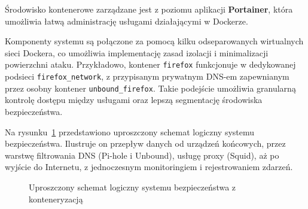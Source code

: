 \documentclass[
    left=2.5cm,         %
    right=2.5cm,        %
    top=2.5cm,          %
    bottom=3cm,         %
    bindingoffset=6mm,  %
    nohyphenation=true %
]{eiti/eiti-thesis} %
\begin{document}
Środowisko kontenerowe zarządzane jest z poziomu aplikacji \textbf{Portainer}, która umożliwia łatwą administrację usługami działającymi w Dockerze.

Komponenty systemu są połączone za pomocą kilku odseparowanych wirtualnych sieci Dockera, co umożliwia implementację zasad izolacji i minimalizacji powierzchni ataku. Przykładowo, kontener \texttt{firefox} funkcjonuje w dedykowanej podsieci \texttt{firefox\_network}, z przypisanym prywatnym DNS-em zapewnianym przez osobny kontener \texttt{unbound\_firefox}. Takie podejście umożliwia granularną kontrolę dostępu między usługami oraz lepszą segmentację środowiska bezpieczeństwa.

Na rysunku~\ref{fig:architektura} przedstawiono uproszczony schemat logiczny systemu bezpieczeństwa. Ilustruje on przepływ danych od urządzeń końcowych, przez warstwę filtrowania DNS (Pi-hole i Unbound), usługę proxy (Squid), aż po wyjście do Internetu, z jednoczesnym monitoringiem i rejestrowaniem zdarzeń.

\newpage 
\begin{figure}[H]
\centering
{}
\caption{Uproszczony schemat logiczny systemu bezpieczeństwa z konteneryzacją}
\label{fig:architektura}
\end{figure}
\end{document}
